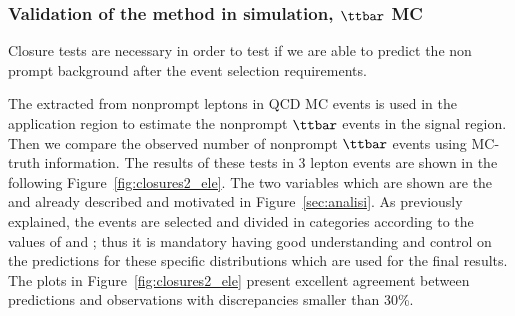 \subsubsection{Validation of the \ttol method in simulation, $\ttbar$ MC }
Closure tests are necessary in order to test if we are able to predict
the non prompt background after the event selection requirements.

The \fr extracted from nonprompt leptons in QCD MC events is
used in the application region to estimate the nonprompt $\ttbar$
events in the signal region. Then we compare the observed number of
nonprompt $\ttbar$ events using MC-truth information. The results of
these tests in 3 lepton events are shown in the following
Figure~\ref{fig:closures2_ele}. The two variables which are shown are
the \mmin and \mlll already described and motivated in
Figure~\ref{sec:analisi}.
As previously explained, the events are selected and divided in
categories according to the values of \mmin and \mlll; thus it is
mandatory having good understanding and control on the predictions for
these specific distributions which are used for the final results. \\
The plots in Figure~\ref{fig:closures2_ele} present excellent
agreement between predictions and observations with discrepancies 
smaller than 30\%.


